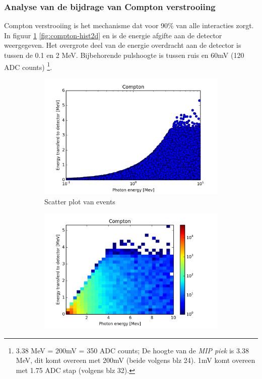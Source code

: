 \documentclass[a4paper,11pt]{article}
\begin{document}
\subsubsection{Analyse van de bijdrage van Compton verstrooiing}
Compton verstrooiing is het mechanisme dat voor 90\% van alle interacties zorgt. In figuur \ref{fig:compton-scatter}  \ref{fig:compton-hist2d} en  is de energie afgifte aan de detector weergegeven. Het overgrote deel van de energie overdracht aan de detector is tussen de 0.1 en 2 MeV. Bijbehorende pulshoogte is tussen ruis en 60mV (120 ADC counts)
\footnote{3.38 MeV = 200mV = 350 ADC counts; De hoogte van de \textit{MIP piek} is 3.38 MeV, dit komt overeen met 200mV (beide volgens \cite*{Pennink:2010} blz 24). 1mV komt overeen met 1.75 ADC stap (volgens \cite*{Pennink:2010} blz 32).}.

\begin{figure}[h]
        \begin{subfigure}[b]{0.6\textwidth}
                \includegraphics[width=1\textwidth]{fig-compton-scatter.png}
                \caption{Scatter plot van events}
                \label{fig:compton-scatter}
        \end{subfigure}
        \begin{subfigure}[b]{0.6\textwidth}
                \includegraphics[width=1\textwidth]{fig-compton-hist2d.png}

\end{subfigure}
\end{figure}
\end{document}
